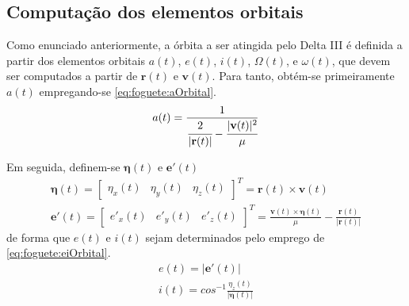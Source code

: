 
\subsection{Computação dos elementos orbitais}

Como enunciado anteriormente, a órbita a ser atingida pelo Delta III é definida a partir dos elementos orbitais $ a(t) $, $ e(t) $, $ i(t) $, $ \Omega(t) $, e $ \omega(t) $, que devem ser computados a partir de $ \mathbf{r}(t) $ e $ \mathbf{v}(t) $. Para tanto, obtém-se primeiramente $ a(t) $ empregando-se \eqref{eq:foguete:aOrbital}.
%
\begin{equation}
	\label{eq:foguete:aOrbital}
	a(t) = \frac{1}{ \cfrac{2}{|\mathbf{r}(t)|} - \cfrac{|\mathbf{v}(t)|^2}{\mu}} 
\end{equation}

Em seguida, definem-se $ {\bm \eta}(t) $ e $ \mathbf{e'}(t) $
%
\begin{equation}
	\begin{gathered}
		{\bm \eta}(t) = \begin{bmatrix} \eta_x(t) & \eta_y(t) & \eta_z(t) \end{bmatrix}^T  = \mathbf{r}(t) \times \mathbf{v}(t) \\
		\mathbf{e'}(t) = \begin{bmatrix} e'_x(t) & e'_y(t) & e'_z(t) \end{bmatrix}^T = \frac{\mathbf{v}(t) \times {\bm \eta}(t)}{\mu} - \frac{\mathbf{r}(t)}{|\mathbf{r}(t)|}
	\end{gathered}
\end{equation}
%
de forma que $ e(t) $ e $ i(t) $ sejam determinados pelo emprego de \eqref{eq:foguete:eiOrbital}.
%
\begin{equation}
	\label{eq:foguete:eiOrbital}
	\begin{gathered}
		e(t) = |\mathbf{e'}(t)| \\
		i(t) = cos^{-1} \frac{\eta_z(t)}{|{\bm \eta}(t)|} 
	\end{gathered}
\end{equation}

